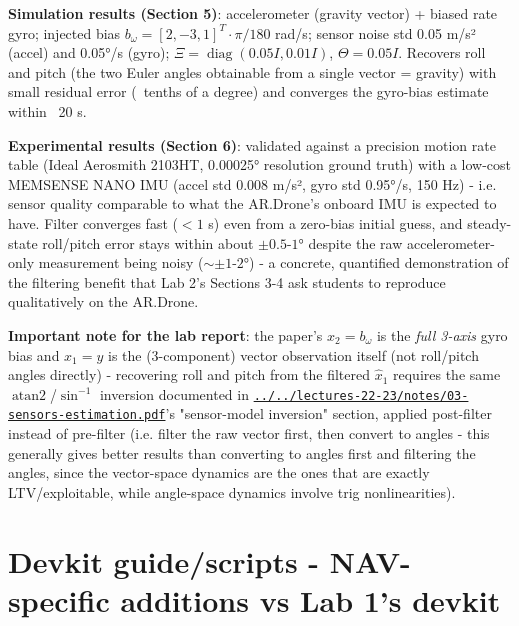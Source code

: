 \documentclass[11pt]{article}
\begin{document}
\textbf{Simulation results (Section 5)}: accelerometer (gravity vector) + biased rate gyro; injected bias $b_\omega=[2,-3,1]^T\cdot\pi/180$ rad/s; sensor noise std 0.05 m/s² (accel) and 0.05°/s (gyro); $\Xi=\operatorname{diag}(0.05I,0.01I)$, $\Theta=0.05I$. Recovers roll and pitch (the two Euler angles obtainable from a single vector = gravity) with small residual error (~tenths of a degree) and converges the gyro-bias estimate within ~20 s.

\textbf{Experimental results (Section 6)}: validated against a precision motion rate table (Ideal Aerosmith 2103HT, 0.00025° resolution ground truth) with a low-cost MEMSENSE NANO IMU (accel std 0.008 m/s², gyro std 0.95°/s, 150 Hz) - i.e. sensor quality comparable to what the AR.Drone's onboard IMU is expected to have. Filter converges fast ($<1$ s) even from a zero-bias initial guess, and steady-state roll/pitch error stays within about $\pm 0.5$-$1°$ despite the raw accelerometer-only measurement being noisy ($\sim\pm 1$-$2°$) - a concrete, quantified demonstration of the filtering benefit that Lab 2's Sections 3-4 ask students to reproduce qualitatively on the AR.Drone.

\textbf{Important note for the lab report}: the paper's $x_2 = b_\omega$ is the \textit{full 3-axis} gyro bias and $x_1 = y$ is the (3-component) vector observation itself (not roll/pitch angles directly) - recovering roll and pitch from the filtered $\hat x_1$ requires the same $\operatorname{atan2}$/$\sin^{-1}$ inversion documented in \href{../../lectures-22-23/notes/03-sensors-estimation.pdf}{\texttt{../../lectures-22-23/notes/03-\allowbreak{}sensors-\allowbreak{}estimation.pdf}}'s "sensor-model inversion" section, applied post-filter instead of pre-filter (i.e. filter the raw vector first, then convert to angles - this generally gives better results than converting to angles first and filtering the angles, since the vector-space dynamics are the ones that are exactly LTV/exploitable, while angle-space dynamics involve trig nonlinearities).

\section{Devkit guide/scripts - NAV-specific additions vs Lab 1's devkit}
\end{document}
